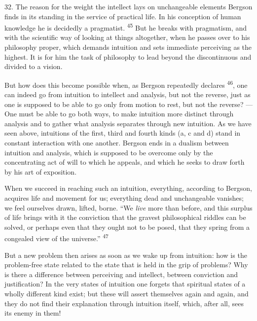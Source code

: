 \documentclass[12pt,a4paper,openany]{book}
\newcommand{\opage}[1]{\marginnote{\footnotesize\textit{[#1]}}}
\newcommand{\nm}[1]{\unskip\textsuperscript{#1}}
\begin{document}
32. The reason for the weight the intellect lays on unchangeable elements Bergson finds in its standing in the service of practical life. In his conception of human knowledge he is decidedly a pragmatist. \nm{45} But he breaks with pragmatism, and with the scientific way of looking at things altogether, when he passes over to his philosophy proper, which demands intuition and sets immediate perceiving as the highest. It is for him the task of philosophy to lead beyond the discontinuous and divided to a vision.

But how does this become possible when, as Bergson repeatedly declares \nm{46}, one can indeed go from intuition to intellect and analysis, but not the reverse, just as one is supposed to be able to go only from motion to rest, but not the reverse? --- One must be able to go both ways, to make intuition more distinct through analysis and to gather what analysis separates through new intuition. As we have seen above, intuitions of the first, third and fourth
\opage{58}kinds (a, c and d) stand in constant interaction with one another. Bergson ends in a dualism between intuition and analysis, which is supposed to be overcome only by the concentrating act of will to which he appeals, and which he seeks to draw forth by his art of exposition.

When we succeed in reaching such an intuition, everything, according to Bergson, acquires life and movement for us; everything dead and unchangeable vanishes; we feel ourselves drawn, lifted, borne. ``We \textit{live} more than before, and this surplus of life brings with it the conviction that the gravest philosophical riddles can be solved, or perhaps even that they ought not to be posed, that they spring from a congealed view of the universe.'' \nm{47}

But a new problem then arises as soon as we wake up from intuition: how is the problem-free state related to the state that is held in the grip of problems? Why is there a difference between perceiving and intellect, between conviction and justification? In the very states of intuition one forgets that spiritual states of a wholly different kind exist; but these will assert themselves again and again, and they do not find their explanation through intuition itself, which, after all, sees its enemy in them!
\end{document}
